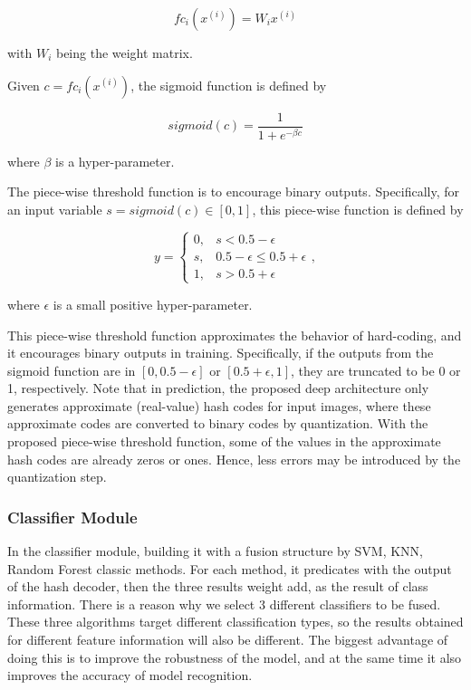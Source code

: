 \documentclass[12pt]{article}
\begin{document}
\begin{equation}
    \label{eq:eq_descr_1}
    fc_i(x^{(i)}) = W_ix^{(i)}
\end{equation}

with $W_i$ being the weight matrix.

Given $c=fc_i(x^{(i)})$, the sigmoid function
is defined by 

\begin{equation}
    \label{eq:eq_descr_2}
    sigmoid(c) = \frac{1}{1+e^{-\beta c}}
\end{equation}

where $\beta$ is a hyper-parameter.

The piece-wise threshold function is to 
encourage binary outputs. Specifically, for an 
input variable $s = sigmoid(c) \in [0,1]$, 
this piece-wise function is defined by

\begin{equation}
    \label{eq:eq_descr_3}
    y = \left\{
        \begin{array}{lr}
            0, & s < 0.5-\epsilon \\
            s, & 0.5-\epsilon \le 0.5+\epsilon \\
            1, & s > 0.5+\epsilon
        \end{array}
    \right.\nonumber,
\end{equation}

where $\epsilon$ is a small positive 
hyper-parameter.

This piece-wise threshold function 
approximates the behavior of hard-coding, 
and it encourages binary outputs in training. 
Specifically, if the outputs from the sigmoid 
function are in $[0, 0.5-\epsilon]$ or 
$[0.5+\epsilon, 1]$, they are truncated to be 
0 or 1, respectively. Note that in prediction, 
the proposed deep architecture only generates 
approximate (real-value) hash codes for input 
images, where these approximate codes are 
converted to binary codes by quantization. 
With the proposed piece-wise threshold 
function, some of the values in the 
approximate hash codes are already zeros or 
ones. Hence, less errors may be introduced
by the quantization step.

\subsubsection{Classifier Module}
\label{sec:MethNetCls}

In the classifier module, building it with
a fusion structure by SVM, KNN, Random
Forest classic methods. For each method, it 
predicates with the output of the hash decoder,
then the three results weight add, as the 
result of class information. There is a reason
why we select 3 different classifiers to be 
fused. These three algorithms target 
different classification types, so the 
results obtained for different feature 
information will also be different. The 
biggest advantage of doing this is to 
improve the robustness of the model, 
and at the same time it also improves 
the accuracy of model recognition. 
\end{document}
